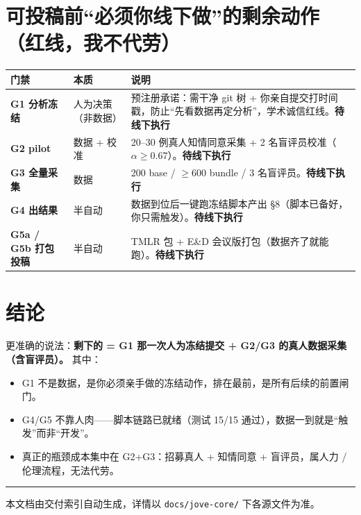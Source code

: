 \documentclass[11pt,a4paper]{ctexart}
\newcommand{\pending}{\textcolor{warn}{\textbf{待线下执行}}}
\begin{document}
\section{可投稿前“必须你线下做”的剩余动作（红线，我不代劳）}

\begin{longtable}{@{}p{2.6cm}p{3.2cm}p{9cm}@{}}
\toprule
\textbf{门禁} & \textbf{本质} & \textbf{说明}\\
\midrule
\endhead
\textbf{G1 分析冻结} & 人为决策（非数据） & 预注册承诺：需干净 git 树 + 你亲自提交打时间戳，防止“先看数据再定分析”，学术诚信红线。\pending\\
\addlinespace
\textbf{G2 pilot} & 数据 + 校准 & 20--30 例真人知情同意采集 + 2 名盲评员校准（$\alpha \geq 0.67$）。\pending\\
\addlinespace
\textbf{G3 全量采集} & 数据 & 200 base / $\geq$600 bundle / 3 名盲评员。\pending\\
\addlinespace
\textbf{G4 出结果} & 半自动 & 数据到位后一键跑冻结脚本产出 §8（脚本已备好，你只需触发）。\pending\\
\addlinespace
\textbf{G5a / G5b 打包投稿} & 半自动 & TMLR 包 + E\&D 会议版打包（数据齐了就能跑）。\pending\\
\bottomrule
\end{longtable}

\section{结论}
更准确的说法：\textbf{剩下的 = G1 那一次人为冻结提交 + G2/G3 的真人数据采集（含盲评员）。} 其中：
\begin{itemize}
\item G1 不是数据，是你必须亲手做的冻结动作，排在最前，是所有后续的前置闸门。
\item G4/G5 不靠人肉——脚本链路已就绪（测试 15/15 通过），数据一到就是“触发”而非“开发”。
\item 真正的瓶颈成本集中在 G2+G3：招募真人 + 知情同意 + 盲评员，属人力 / 伦理流程，无法代劳。
\end{itemize}

\vspace{10pt}
\hrule
\vspace{4pt}
{\small\color{gray} 本文档由交付索引自动生成，详情以 \texttt{docs/jove-core/} 下各源文件为准。}
\end{document}
